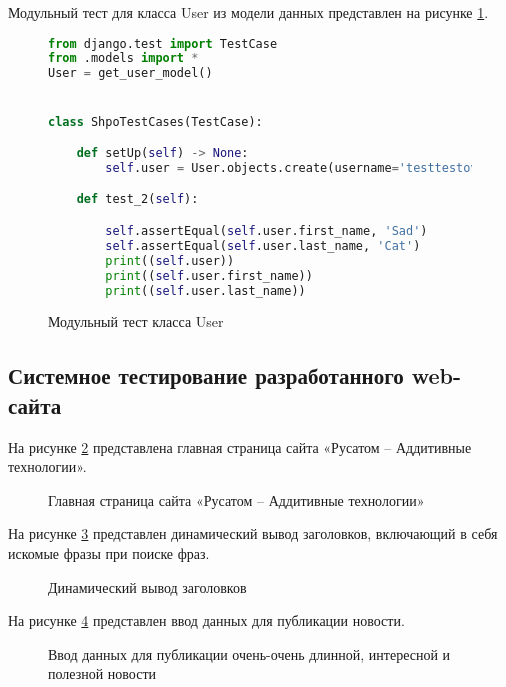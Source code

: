 Модульный тест для класса User из модели данных представлен на рисунке \ref{unitUser:image}.

\begin{figure}[ht]
\begin{lstlisting}[language=Python]
from django.test import TestCase
from .models import *
User = get_user_model()


class ShpoTestCases(TestCase):

    def setUp(self) -> None:
        self.user = User.objects.create(username='testtestovich', password='testtestovich', first_name='Sad', last_name='')

    def test_2(self):

        self.assertEqual(self.user.first_name, 'Sad')
        self.assertEqual(self.user.last_name, 'Cat')
        print((self.user))
        print((self.user.first_name))
        print((self.user.last_name))
\end{lstlisting}  
\caption{Модульный тест класса User}
\label{unitUser:image}
\end{figure}

\subsection{Системное тестирование разработанного web-сайта}

На рисунке \ref{main:image} представлена главная страница сайта «Русатом – Аддитивные технологии».

\vspace{-8mm}
\begin{figure}[ht]
\caption{Главная страница сайта «Русатом – Аддитивные технологии»}
\label{main:image}
\end{figure}

\newpage %
На рисунке \ref{menu:image} представлен динамический вывод заголовков, включающий в себя искомые фразы при поиске фраз.

\vspace{-8mm}
\begin{figure}[ht]
\caption{Динамический вывод заголовков}
\label{menu:image}
\end{figure}

На рисунке \ref{enter:image} представлен ввод данных для публикации новости.
\newpage

\vspace{-8mm}
\begin{figure}[ht]
\caption{Ввод данных для публикации очень-очень длинной, интересной и полезной новости}
\label{enter:image}
\end{figure}
